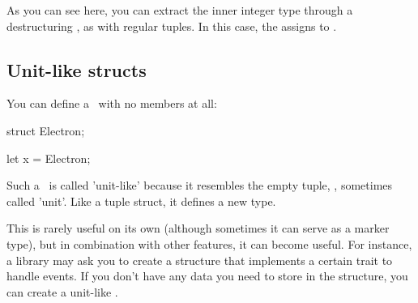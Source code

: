 As you can see here, you can extract the inner integer type through a destructuring \keylet, as with regular tuples. In this case, the 
 assigns  to .

\subsection*{Unit-like structs}

You can define a \struct\ with no members at all:

\begin{rustc}
struct Electron;

let x = Electron;
\end{rustc}

Such a \struct\ is called 'unit-like' because it resembles the empty tuple, \code{()}, sometimes called 'unit'. Like a tuple struct, 
it defines a new type.

\blank

This is rarely useful on its own (although sometimes it can serve as a marker type), but in combination with other features, it can 
become useful. For instance, a library may ask you to create a structure that implements a certain trait to handle events. If you 
don't have any data you need to store in the structure, you can create a unit-like \struct.
